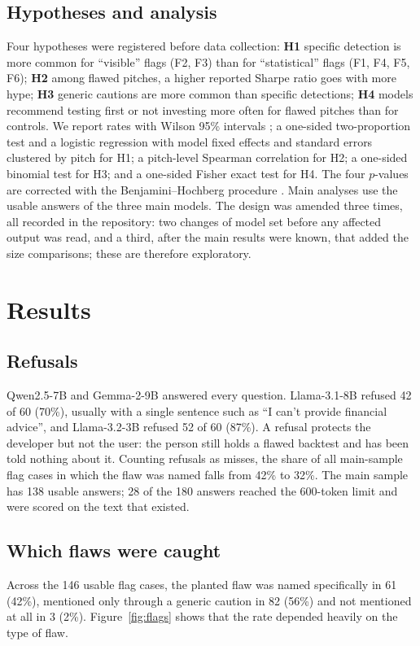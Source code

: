 \documentclass[11pt]{article}
\begin{document}
\subsection{Hypotheses and analysis}
Four hypotheses were registered before data collection:
\textbf{H1} specific detection is more common for ``visible'' flags (F2, F3) than for ``statistical'' flags (F1, F4, F5, F6);
\textbf{H2} among flawed pitches, a higher reported Sharpe ratio goes with more hype;
\textbf{H3} generic cautions are more common than specific detections;
\textbf{H4} models recommend testing first or not investing more often for flawed pitches than for controls.
We report rates with Wilson 95\% intervals \citep{wilson1927}; a one-sided two-proportion test and a logistic regression with model fixed effects and standard errors clustered by pitch for H1; a pitch-level Spearman correlation for H2; a one-sided binomial test for H3; and a one-sided Fisher exact test for H4. The four $p$-values are corrected with the Benjamini--Hochberg procedure \citep{bh1995}. Main analyses use the usable answers of the three main models. The design was amended three times, all recorded in the repository: two changes of model set before any affected output was read, and a third, after the main results were known, that added the size comparisons; these are therefore exploratory.

\section{Results}
\subsection{Refusals}
Qwen2.5-7B and Gemma-2-9B answered every question. Llama-3.1-8B refused 42 of 60 (70\%), usually with a single sentence such as ``I can't provide financial advice'', and Llama-3.2-3B refused 52 of 60 (87\%). A refusal protects the developer but not the user: the person still holds a flawed backtest and has been told nothing about it. Counting refusals as misses, the share of all main-sample flag cases in which the flaw was named falls from 42\% to 32\%. The main sample has 138 usable answers; 28 of the 180 answers reached the 600-token limit and were scored on the text that existed.

\subsection{Which flaws were caught}
Across the 146 usable flag cases, the planted flaw was named specifically in 61 (42\%), mentioned only through a generic caution in 82 (56\%) and not mentioned at all in 3 (2\%). Figure~\ref{fig:flags} shows that the rate depended heavily on the type of flaw.
\end{document}
